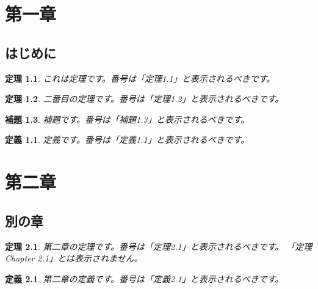\documentclass{jbook}
\newtheorem{theorem}{定理}[chapter]  %
\newtheorem{lemma}[theorem]{補題}     %
\newtheorem{definition}{定義}[chapter] %
\begin{document}
\chapter{第一章}  %

\section{はじめに}  %

\begin{theorem}
これは定理です。番号は「定理1.1」と表示されるべきです。
\end{theorem}

\begin{theorem}
二番目の定理です。番号は「定理1.2」と表示されるべきです。
\end{theorem}

\begin{lemma}
補題です。番号は「補題1.3」と表示されるべきです。
\end{lemma}

\begin{definition}
定義です。番号は「定義1.1」と表示されるべきです。
\end{definition}

\chapter{第二章}  %

\section{別の章}  %

\begin{theorem}
第二章の定理です。番号は「定理2.1」と表示されるべきです。
「定理 Chapter 2.1」とは表示されません。
\end{theorem}

\begin{definition}
第二章の定義です。番号は「定義2.1」と表示されるべきです。
\end{definition}
\end{document}
